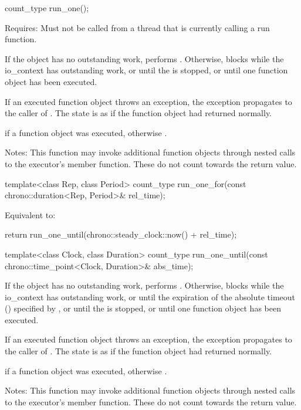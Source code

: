 \begin{itemdecl}
count_type run_one();
\end{itemdecl}

\begin{itemdescr}
\pnum
Requires: Must not be called from a thread that is currently calling a run function.

\pnum
\effects If the  object has no outstanding work, performs . Otherwise, blocks while the io_context has outstanding work, or until the  is stopped, or until one function object has been executed.

\pnum
If an executed function object throws an exception, the exception propagates to the caller of . The  state is as if the function object had returned normally.

\pnum
\returns {} if a function object was executed, otherwise .

\pnum
Notes: This function may invoke additional function objects through nested calls to the  executor's  member function. These do not count towards the return value.
\end{itemdescr}

\begin{itemdecl}
template<class Rep, class Period>
  count_type run_one_for(const chrono::duration<Rep, Period>& rel_time);
\end{itemdecl}

\begin{itemdescr}
\pnum
\effects Equivalent to: 
\begin{codeblock}
return run_one_until(chrono::steady_clock::now() + rel_time);
\end{codeblock}

\end{itemdescr}

\begin{itemdecl}
template<class Clock, class Duration>
  count_type run_one_until(const chrono::time_point<Clock, Duration>& abs_time);
\end{itemdecl}

\begin{itemdescr}
\pnum
\effects If the  object has no outstanding work, performs . Otherwise, blocks while the io_context has outstanding work, or until the expiration of the absolute timeout () specified by , or until the  is stopped, or until one function object has been executed.

\pnum
If an executed function object throws an exception, the exception propagates to the caller of . The  state is as if the function object had returned normally.

\pnum
\returns {} if a function object was executed, otherwise .

\pnum
Notes: This function may invoke additional function objects through nested calls to the  executor's  member function. These do not count towards the return value.
\end{itemdescr}


